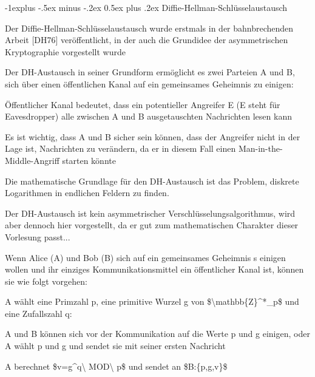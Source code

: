 \documentclass[a4paper]{article}
\makeatletter
\renewcommand{\subsection}{\@startsection{subsection}{2}{0mm}%
 {-1explus -.5ex minus -.2ex}%
 {0.5ex plus .2ex}%
 {\normalfont\normalsize\bfseries}}
\makeatother
\begin{document}
\begin{multicols}{3}
      \subsection{Diffie-Hellman-Schlüsselaustausch}

      \begin{itemize*}
            \item Der Diffie-Hellman-Schlüsselaustausch wurde erstmals in der
            bahnbrechenden Arbeit {[}DH76{]} veröffentlicht, in der auch die
            Grundidee der asymmetrischen Kryptographie vorgestellt wurde
            \item Der DH-Austausch in seiner Grundform ermöglicht es zwei Parteien A und
            B, sich über einen öffentlichen Kanal auf ein gemeinsames Geheimnis zu
            einigen:
            \begin{itemize*}
                  \item Öffentlicher Kanal bedeutet, dass ein potentieller Angreifer E (E steht für Eavesdropper) alle zwischen A und B ausgetauschten Nachrichten lesen kann
                  \item Es ist wichtig, dass A und B sicher sein können, dass der Angreifer nicht in der Lage ist, Nachrichten zu verändern, da er in diesem Fall einen Man-in-the-Middle-Angriff starten könnte
                  \item Die mathematische Grundlage für den DH-Austausch ist das Problem, diskrete Logarithmen in endlichen Feldern zu finden.
                  \item Der DH-Austausch ist kein asymmetrischer Verschlüsselungsalgorithmus, wird aber dennoch hier vorgestellt, da er gut zum mathematischen Charakter dieser Vorlesung passt...
            \end{itemize*}
            \item Wenn Alice (A) und Bob (B) sich auf ein gemeinsames Geheimnis s
            einigen wollen und ihr einziges Kommunikationsmittel ein öffentlicher
            Kanal ist, können sie wie folgt vorgehen:
            \begin{itemize*}
                  \item A wählt eine Primzahl p, eine primitive Wurzel g von \$\textbackslash mathbb\{Z\}\^{}*\_p\$ und eine Zufallszahl q:
                  \begin{itemize*} \item A und B können sich vor der Kommunikation auf die Werte p und g einigen, oder A wählt p und g und sendet sie mit seiner ersten Nachricht \item A berechnet \$v=g\^{}q\textbackslash{} MOD\textbackslash{} p\$ und sendet an \$B:\{p,g,v\}\$ \end{itemize*}

\end{itemize*}
\end{itemize*}
\end{multicols}
\end{document}
